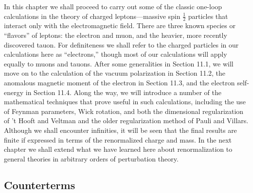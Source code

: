 
In this chapter we shall proceed to carry out some of the classic one-loop
calculations in the theory of charged leptons---massive spin $\tfrac12$ particles
that interact only with the electromagnetic field. There are three known
species or ``flavors'' of leptons: the electron and muon, and the heavier,
more recently discovered tauon. For definiteness we shall refer to the
charged particles in our calculations here as ``electrons,'' though most of
our calculations will apply equally to muons and tauons. After some
generalities in Section 11.1, we will move on to the calculation of the
vacuum polarization in Section 11.2, the anomalous magnetic moment of
the electron in Section 11.3, and the electron self-energy in Section 11.4.
Along the way, we will introduce a number of the mathematical techniques
that prove useful in such calculations, including the use of Feynman
parameters, Wick rotation, and both the dimensional regularization of
't Hooft and Veltman and the older regularization method of Pauli and
Villars. Although we shall encounter infinities, it will be seen that the
final results are finite if expressed in terms of the renormalized charge
and mass. In the next chapter we shall extend what we have learned
here about renormalization to general theories in arbitrary orders of
perturbation theory.

\subsection{Counterterms}

